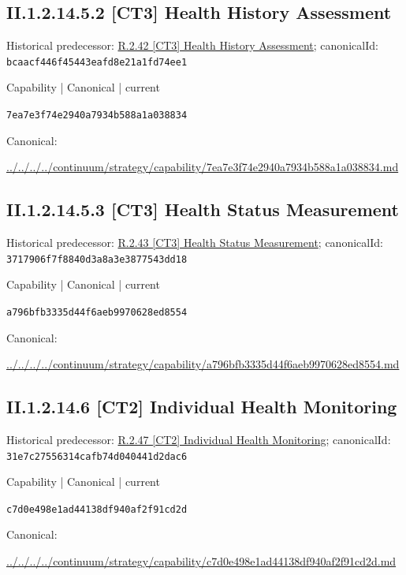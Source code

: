 \documentclass[10pt,a4paper]{article}
\begin{document}
\subsection*{II.1.2.14.5.2 [CT3] Health History Assessment}
Historical predecessor: \hyperref[element-bcaacf446f45443eafd8e21a1fd74ee1]{R.2.42 [CT3] Health History Assessment}; canonicalId: \texttt{bcaacf446f45443eafd8e21a1fd74ee1}\par
\label{element-7ea7e3f74e2940a7934b588a1a038834}
{\small Capability | Canonical | current}\par
\texttt{7ea7e3f74e2940a7934b588a1a038834}\par
Canonical: \par
{\footnotesize\url{../../../../continuum/strategy/capability/7ea7e3f74e2940a7934b588a1a038834.md}}\par
\subsection*{II.1.2.14.5.3 [CT3] Health Status Measurement}
Historical predecessor: \hyperref[element-3717906f7f8840d3a8a3e3877543dd18]{R.2.43 [CT3] Health Status Measurement}; canonicalId: \texttt{3717906f7f8840d3a8a3e3877543dd18}\par
\label{element-a796bfb3335d44f6aeb9970628ed8554}
{\small Capability | Canonical | current}\par
\texttt{a796bfb3335d44f6aeb9970628ed8554}\par
Canonical: \par
{\footnotesize\url{../../../../continuum/strategy/capability/a796bfb3335d44f6aeb9970628ed8554.md}}\par
\subsection*{II.1.2.14.6 [CT2] Individual Health Monitoring}
Historical predecessor: \hyperref[element-31e7c27556314cafb74d040441d2dac6]{R.2.47 [CT2] Individual Health Monitoring}; canonicalId: \texttt{31e7c27556314cafb74d040441d2dac6}\par
\label{element-c7d0e498e1ad44138df940af2f91cd2d}
{\small Capability | Canonical | current}\par
\texttt{c7d0e498e1ad44138df940af2f91cd2d}\par
Canonical: \par
{\footnotesize\url{../../../../continuum/strategy/capability/c7d0e498e1ad44138df940af2f91cd2d.md}}\par
\end{document}
